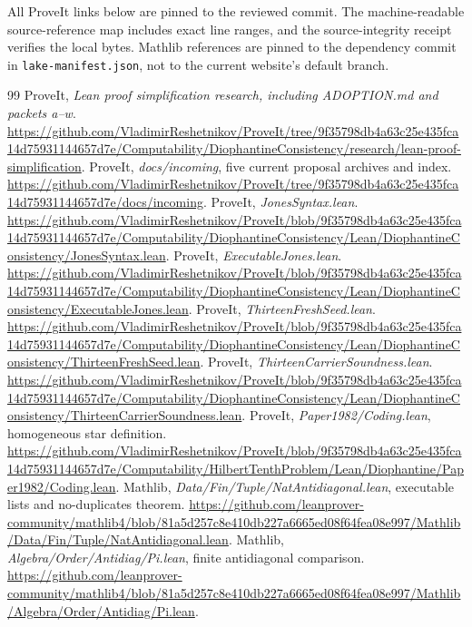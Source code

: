 \documentclass[11pt,letterpaper]{article}
\newcommand{\code}[1]{{\small\nolinkurl{#1}}}
\begin{document}
All ProveIt links below are pinned to the reviewed commit. The machine-readable source-reference map includes exact line ranges, and the source-integrity receipt verifies the local bytes. Mathlib references are pinned to the dependency commit in \code{lake-manifest.json}, not to the current website's default branch.

\begin{thebibliography}{99}
\small
{} ProveIt, \emph{Lean proof simplification research, including ADOPTION.md and packets a--w}. \url{https://github.com/VladimirReshetnikov/ProveIt/tree/9f35798db4a63c25e435fca14d75931144657d7e/Computability/DiophantineConsistency/research/lean-proof-simplification}.
 ProveIt, \emph{docs/incoming}, five current proposal archives and index. \url{https://github.com/VladimirReshetnikov/ProveIt/tree/9f35798db4a63c25e435fca14d75931144657d7e/docs/incoming}.
 ProveIt, \emph{JonesSyntax.lean}. \url{https://github.com/VladimirReshetnikov/ProveIt/blob/9f35798db4a63c25e435fca14d75931144657d7e/Computability/DiophantineConsistency/Lean/DiophantineConsistency/JonesSyntax.lean}.
 ProveIt, \emph{ExecutableJones.lean}. \url{https://github.com/VladimirReshetnikov/ProveIt/blob/9f35798db4a63c25e435fca14d75931144657d7e/Computability/DiophantineConsistency/Lean/DiophantineConsistency/ExecutableJones.lean}.
 ProveIt, \emph{ThirteenFreshSeed.lean}. \url{https://github.com/VladimirReshetnikov/ProveIt/blob/9f35798db4a63c25e435fca14d75931144657d7e/Computability/DiophantineConsistency/Lean/DiophantineConsistency/ThirteenFreshSeed.lean}.
 ProveIt, \emph{ThirteenCarrierSoundness.lean}. \url{https://github.com/VladimirReshetnikov/ProveIt/blob/9f35798db4a63c25e435fca14d75931144657d7e/Computability/DiophantineConsistency/Lean/DiophantineConsistency/ThirteenCarrierSoundness.lean}.
 ProveIt, \emph{Paper1982/Coding.lean}, homogeneous star definition. \url{https://github.com/VladimirReshetnikov/ProveIt/blob/9f35798db4a63c25e435fca14d75931144657d7e/Computability/HilbertTenthProblem/Lean/Diophantine/Paper1982/Coding.lean}.
 Mathlib, \emph{Data/Fin/Tuple/NatAntidiagonal.lean}, executable lists and no-duplicates theorem. \url{https://github.com/leanprover-community/mathlib4/blob/81a5d257c8e410db227a6665ed08f64fea08e997/Mathlib/Data/Fin/Tuple/NatAntidiagonal.lean}.
 Mathlib, \emph{Algebra/Order/Antidiag/Pi.lean}, finite antidiagonal comparison. \url{https://github.com/leanprover-community/mathlib4/blob/81a5d257c8e410db227a6665ed08f64fea08e997/Mathlib/Algebra/Order/Antidiag/Pi.lean}.

\end{thebibliography}
\end{document}
